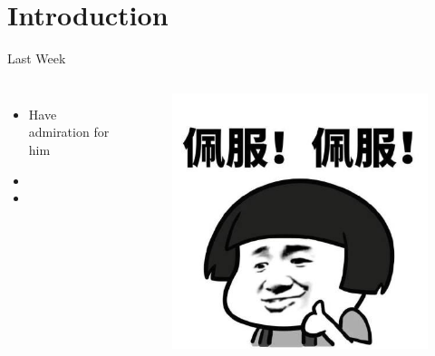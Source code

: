 \section{Introduction}

\begin{frame}[fragile]{Last Week}
	\begin{columns}[onlytextwidth]
		
		\begin{itemize}
			\item Have admiration for him
			\item 
			\item 
		\end{itemize}
		
		
		\begin{figure}
			\includegraphics[width=.5\linewidth]{peifu.jpg}
		\end{figure}
		
	\end{columns}
\end{frame}


